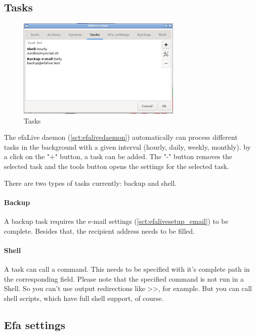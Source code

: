 \documentclass[a4paper,12pt,twoside]{article}
\begin{document}
\subsection{Tasks}
\label{sct:efalivesetup_tasks}

\begin{figure}
    \centering
    \includegraphics[width=8cm]{screenshots/efalive_setup_tasks.png}
    \caption{Tasks}
    \label{fig:efalivesetup_tasks}
\end{figure}

The efaLive daemon (\ref{sct:efalivedaemon}) automatically can process 
different tasks in the background with a given interval (hourly, daily, 
weekly, monthly). by a click on the "+" button, a task can be added. The "-" 
button removes the selected task and the tools button opens the settings 
for the selected task.

There are two types of tasks currently: backup and shell.

\paragraph{Backup}
A backup task requires the e-mail settings (\ref{sct:efalivesetup_email})
to be complete. Besides that, the recipient address needs to be filled.

\paragraph{Shell}
A task can call a command. This needs to be specified with it's complete path
in the corresponding field. Please note that the specified command is not run
in a Shell. So you can't use output redirections like >>, for example. But you 
can call shell scripts, which have full shell support, of course.


\subsection{Efa settings}
\label{sct:efalivesetup_settings}
\end{document}
